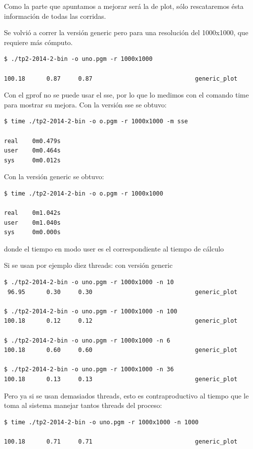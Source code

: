 \documentclass[a4paper,10pt]{article}
\begin{document}
Como la parte que apuntamos a mejorar será la de plot, sólo rescataremos ésta información de todas las corridas.

Se volvió a correr la versión generic pero para una resolución del 1000x1000, que requiere más cómputo.

\begin{verbatim}
$ ./tp2-2014-2-bin -o uno.pgm -r 1000x1000

100.18      0.87     0.87                             generic_plot
\end{verbatim}


Con el gprof no se puede usar el sse, por lo que lo medimos con el comando time para mostrar su mejora.
Con la versión sse se obtuvo:
\begin{verbatim}
$ time ./tp2-2014-2-bin -o o.pgm -r 1000x1000 -m sse

real    0m0.479s
user    0m0.464s
sys     0m0.012s
\end{verbatim}
Con la versión generic se obtuvo:
\begin{verbatim}
$ time ./tp2-2014-2-bin -o o.pgm -r 1000x1000

real    0m1.042s
user    0m1.040s
sys     0m0.000s
\end{verbatim}
donde el tiempo en modo user es el correspondiente al tiempo de cálculo


Si se usan por ejemplo diez threads:
con versión generic
\begin{verbatim}
$ ./tp2-2014-2-bin -o uno.pgm -r 1000x1000 -n 10
 96.95      0.30     0.30                             generic_plot

$ ./tp2-2014-2-bin -o uno.pgm -r 1000x1000 -n 100
100.18      0.12     0.12                             generic_plot

$ ./tp2-2014-2-bin -o uno.pgm -r 1000x1000 -n 6
100.18      0.60     0.60                             generic_plot

$ ./tp2-2014-2-bin -o uno.pgm -r 1000x1000 -n 36
100.18      0.13     0.13                             generic_plot
 \end{verbatim}


Pero ya si se usan demasiados threads, esto es contraproductivo al tiempo que le toma al sistema manejar tantos threads del proceso:
\begin{verbatim}
$ time ./tp2-2014-2-bin -o uno.pgm -r 1000x1000 -n 1000

100.18      0.71     0.71                             generic_plot
\end{verbatim}
\end{document}
